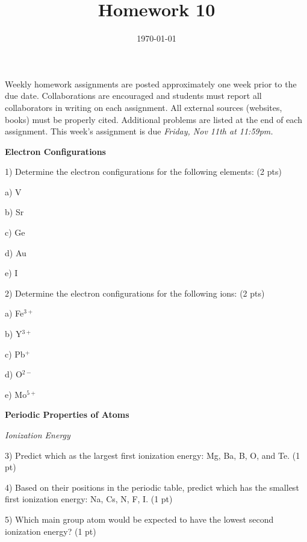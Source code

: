 \documentclass[12pt]{article}
\title{\textbf{Homework 10}}
\date{\vspace{-2em}\today}
\begin{document}
\maketitle 

Weekly homework assignments are posted approximately one week prior to the
due date. Collaborations are encouraged and students must report all collaborators
in writing on each assignment. All external sources (websites, books) must be
properly cited. Additional problems are listed at the end of each assignment.
This week's assignment is due \textit{Friday, Nov 11th at 11:59pm.}

\textbf{Electron Configurations}

1) Determine the electron configurations for the following elements:
(2 pts)

a) V
\vspace{0.2in}

b) Sr
\vspace{0.2in}

c) Ge
\vspace{0.2in}

d) Au
\vspace{0.2in}

e) I
\vspace{0.2in}

2) Determine the electron configurations for the following ions:
(2 pts)

a) Fe$^{3+}$
\vspace{0.2in}

b) Y$^{3+}$
\vspace{0.2in}

c) Pb$^+$
\vspace{0.2in}

d) O$^{2-}$
\vspace{0.2in}

e) Mo$^{5+}$
\vspace{0.4in}

\textbf{Periodic Properties of Atoms}

\textit{Ionization Energy}

3) Predict which as the largest first ionization energy: Mg, Ba, B, O,
and Te. (1 pt)
\vspace{0.4in}

4) Based on their positions in the periodic table, predict which has the
smallest first ionization energy: Na, Cs, N, F, I.  (1 pt)
\vspace{0.4in}

5) Which main group atom would be expected to have the lowest second ionization
energy? (1 pt)
\vspace{0.4in}
\end{document}
